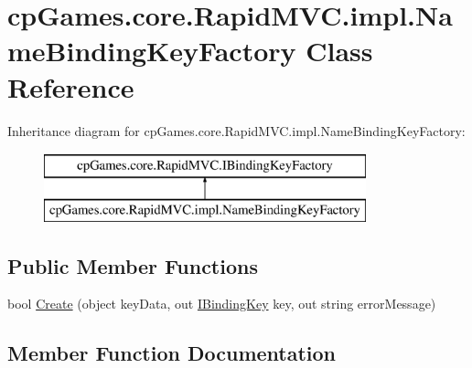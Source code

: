 \hypertarget{classcp_games_1_1core_1_1_rapid_m_v_c_1_1impl_1_1_name_binding_key_factory}{}\section{cp\+Games.\+core.\+Rapid\+M\+V\+C.\+impl.\+Name\+Binding\+Key\+Factory Class Reference}
\label{classcp_games_1_1core_1_1_rapid_m_v_c_1_1impl_1_1_name_binding_key_factory}
Inheritance diagram for cp\+Games.\+core.\+Rapid\+M\+V\+C.\+impl.\+Name\+Binding\+Key\+Factory\+:\begin{figure}[H]
\begin{center}
\leavevmode
\includegraphics[height=2.000000cm]{classcp_games_1_1core_1_1_rapid_m_v_c_1_1impl_1_1_name_binding_key_factory}
\end{center}
\end{figure}
\subsection*{Public Member Functions}
\begin{DoxyCompactItemize}
\item 
bool \mbox{\hyperlink{classcp_games_1_1core_1_1_rapid_m_v_c_1_1impl_1_1_name_binding_key_factory_a945458041047fa0ca19f6e25a5e6da11}{Create}} (object key\+Data, out \mbox{\hyperlink{interfacecp_games_1_1core_1_1_rapid_m_v_c_1_1_i_binding_key}{I\+Binding\+Key}} key, out string error\+Message)
\end{DoxyCompactItemize}


\subsection{Member Function Documentation}
\mbox{\label{classcp_games_1_1core_1_1_rapid_m_v_c_1_1impl_1_1_name_binding_key_factory_a945458041047fa0ca19f6e25a5e6da11}} 

